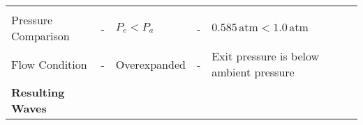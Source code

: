 \begin{longtable}[]{@{}lllll@{}}
\begin{minipage}[t]{0.12\columnwidth}
\strut
\end{minipage} & \begin{minipage}[t]{0.06\columnwidth}\raggedright
\strut
\end{minipage} & \begin{minipage}[t]{0.38\columnwidth}\raggedright
\strut
\end{minipage}\tabularnewline
\begin{minipage}[t]{0.23\columnwidth}\raggedright
Pressure Comparison\strut
\end{minipage} & \begin{minipage}[t]{0.07\columnwidth}\raggedright
-\strut
\end{minipage} & \begin{minipage}[t]{0.12\columnwidth}\raggedright
\(P_e < P_a\)\strut
\end{minipage} & \begin{minipage}[t]{0.06\columnwidth}\raggedright
-\strut
\end{minipage} & \begin{minipage}[t]{0.38\columnwidth}\raggedright
\(0.585 \, \text{atm} < 1.0 \, \text{atm}\)\strut
\end{minipage}\tabularnewline
\begin{minipage}[t]{0.23\columnwidth}\raggedright
Flow Condition\strut
\end{minipage} & \begin{minipage}[t]{0.07\columnwidth}\raggedright
-\strut
\end{minipage} & \begin{minipage}[t]{0.12\columnwidth}\raggedright
Overexpanded\strut
\end{minipage} & \begin{minipage}[t]{0.06\columnwidth}\raggedright
-\strut
\end{minipage} & \begin{minipage}[t]{0.38\columnwidth}\raggedright
Exit pressure is below ambient pressure\strut
\end{minipage}\tabularnewline
\begin{minipage}[t]{0.23\columnwidth}\raggedright
\textbf{Resulting Waves}\strut
\end{minipage} & \begin{minipage}[t]{0.07\columnwidth}\raggedright
\strut
\end{minipage} & \begin{minipage}[t]{0.12\columnwidth}\raggedright
\strut
\end{minipage} & \begin{minipage}[t]{0.06\columnwidth}\raggedright

\end{minipage}
\end{longtable}
